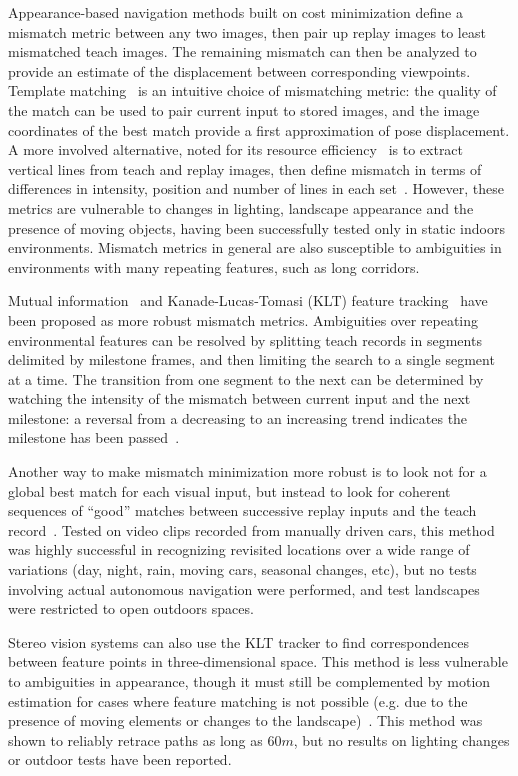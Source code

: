 \documentclass[twocolumn, 9pt,fleqn]{jsproceedings}
\begin{document}
Appearance-based navigation methods built on cost minimization define a mismatch metric between any two images, then pair up replay images to least mismatched teach images. The remaining mismatch can then be analyzed to provide an estimate of the displacement between corresponding viewpoints. Template matching~\cite{MAT96} is an intuitive choice of mismatching metric: the quality of the match can be used to pair current input to stored images, and the image coordinates of the best match provide a first approximation of pose displacement. A more involved alternative, noted for its resource efficiency~\cite{BON02} is to extract vertical lines from teach and replay images, then define mismatch in terms of differences in intensity, position and number of lines in each set~\cite{OYA96}. However, these metrics are vulnerable to changes in lighting, landscape appearance and the presence of moving objects, having been successfully tested only in static indoors environments. Mismatch metrics in general are also susceptible to ambiguities in environments with many repeating features, such as long corridors.

Mutual information~\cite{STE12} and Kanade-Lucas-Tomasi (KLT) feature tracking~\cite{CHE06} have been proposed as more robust mismatch metrics. Ambiguities over repeating environmental features can be resolved by splitting teach records in segments delimited by milestone frames, and then limiting the search to a single segment at a time. The transition from one segment to the next can be determined by watching the intensity of the mismatch between current input and the next milestone: a reversal from a decreasing to an increasing trend indicates the milestone has been passed~\cite{MAT96,CHE06}.

Another way to make mismatch minimization more robust is to look not for a global best match for each visual input, but instead to look for coherent sequences of ``good'' matches between successive replay inputs and the teach record~\cite{MIL12}. Tested on video clips recorded from manually driven cars, this method was highly successful in recognizing revisited locations over a wide range of variations (day, night, rain, moving cars, seasonal changes, etc), but no tests involving actual autonomous navigation were performed, and test landscapes were restricted to open outdoors spaces.

Stereo vision systems can also use the KLT tracker to find correspondences between feature points in three-dimensional space. This method is less vulnerable to ambiguities in appearance, though it must still be complemented by motion estimation for cases where feature matching is not possible (e.g. due to the presence of moving elements or changes to the landscape)~\cite{KIM08}. This method was shown to reliably retrace paths as long as $60m$, but no results on lighting changes or outdoor tests have been reported.
\end{document}
